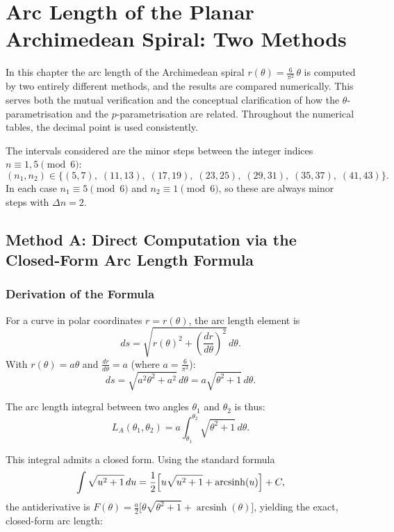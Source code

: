 \chapter{Arc Length of the Planar Archimedean Spiral: Two Methods}
\label{sec:bogenlaenge_spirale}

In this chapter the arc length of the Archimedean spiral
$r(\theta) = \frac{6}{\pi^2}\,\theta$ is computed by two entirely different
methods, and the results are compared numerically. This serves both the
mutual verification and the conceptual clarification of how the
$\theta$-parametrisation and the $p$-parametrisation are related.
Throughout the numerical tables, the decimal point is used consistently.

The intervals considered are the minor steps between the
integer indices $n \equiv 1, 5 \pmod 6$:
\[
(n_1, n_2) \in
\{(5,7),\;(11,13),\;(17,19),\;(23,25),\;(29,31),\;(35,37),\;(41,43)\}.
\]
In each case $n_1 \equiv 5 \pmod 6$ and $n_2 \equiv 1 \pmod 6$, so these
are always minor steps with $\Delta n = 2$.

\section{Method A: Direct Computation via the Closed-Form Arc Length Formula}
\label{sec:methode_A}

\subsection{Derivation of the Formula}

For a curve in polar coordinates $r = r(\theta)$, the
arc length element is
\[
ds = \sqrt{r(\theta)^2 + \left(\frac{dr}{d\theta}\right)^2}\,d\theta.
\]
With $r(\theta) = a\theta$ and $\frac{dr}{d\theta} = a$ (where $a = \frac{6}{\pi^2}$):
\[
ds = \sqrt{a^2\theta^2 + a^2}\,d\theta = a\sqrt{\theta^2 + 1}\,d\theta.
\]

The arc length integral between two angles $\theta_1$ and $\theta_2$ is thus:
\[
L_A(\theta_1, \theta_2)
= a\int_{\theta_1}^{\theta_2}\sqrt{\theta^2 + 1}\,d\theta.
\]

This integral admits a closed form. Using the standard formula
\[
\int \sqrt{u^2+1}\,du
= \frac{1}{2}\Bigl[u\sqrt{u^2+1} + \operatorname{arcsinh}(u)\Bigr] + C,
\]
the antiderivative is $F(\theta) = \frac{a}{2}\bigl[\theta\sqrt{\theta^2+1}
+ \operatorname{arcsinh}(\theta)\bigr]$, yielding the exact, closed-form arc length:


